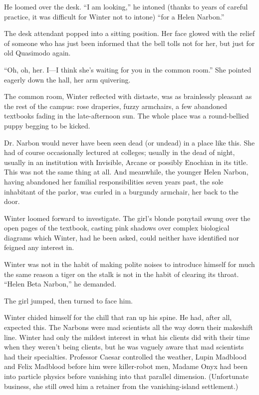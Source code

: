 \documentclass[ebook,10pt]{memoir}
\begin{document}
He loomed over the desk. ``I am looking,'' he intoned (thanks to years
of careful practice, it was difficult for Winter not to intone) ``for
a Helen Narbon.''

The desk attendant popped into a sitting position. Her face glowed
with the relief of someone who has just been informed that the bell
tolls not for her, but just for old Quasimodo again.

``Oh, oh, her. I---I think she's waiting for you in the common room.''
She pointed eagerly down the hall, her arm quivering.

The common room, Winter reflected with distaste, was as brainlessly
pleasant as the rest of the campus: rose draperies, fuzzy armchairs, a
few abandoned textbooks fading in the late-afternoon sun. The whole
place was a round-bellied puppy begging to be kicked.

Dr. Narbon would never have been seen dead (or undead) in a place like
this. She had of course occasionally lectured at colleges; usually in
the dead of night, usually in an institution with Invisible, Arcane or
possibly Enochian in its title. This was not the same thing at
all. And meanwhile, the younger Helen Narbon, having abandoned her
familial responsibilities seven years past, the sole inhabitant of the
parlor, was curled in a burgundy armchair, her back to the door.

Winter loomed forward to investigate. The girl's blonde ponytail swung
over the open pages of the textbook, casting pink shadows over complex
biological diagrams which Winter, had he been asked, could neither
have identified nor feigned any interest in.

Winter was not in the habit of making polite noises to introduce
himself for much the same reason a tiger on the stalk is not in the
habit of clearing its throat. ``Helen Beta Narbon,'' he demanded.

The girl jumped, then turned to face him.

Winter chided himself for the chill that ran up his spine. He had,
after all, expected this. The Narbons were mad scientists all the way
down their makeshift line. Winter had only the mildest interest in
what his clients did with their time when they weren't being clients,
but he was vaguely aware that mad scientists had their
specialties. Professor Caesar controlled the weather, Lupin Madblood
and Felix Madblood before him were killer-robot men, Madame Onyx had
been into particle physics before vanishing into that parallel
dimension. (Unfortunate business, she still owed him a retainer from
the vanishing-island settlement.)
\end{document}
